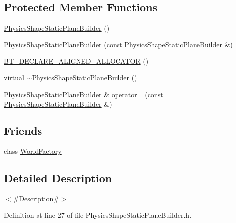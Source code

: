 \subsection*{Protected Member Functions}
\begin{DoxyCompactItemize}
\item 
\mbox{\hyperlink{classnjli_1_1_physics_shape_static_plane_builder_a5a7fa33500a4bbf8273222d57e70e245}{Physics\+Shape\+Static\+Plane\+Builder}} ()
\item 
\mbox{\hyperlink{classnjli_1_1_physics_shape_static_plane_builder_af4b40b5f32bbc64e6e337c76cf2a1c2d}{Physics\+Shape\+Static\+Plane\+Builder}} (const \mbox{\hyperlink{classnjli_1_1_physics_shape_static_plane_builder}{Physics\+Shape\+Static\+Plane\+Builder}} \&)
\item 
\mbox{\hyperlink{classnjli_1_1_physics_shape_static_plane_builder_a84a723711e9c7fc80aae534cb2ccd1ba}{B\+T\+\_\+\+D\+E\+C\+L\+A\+R\+E\+\_\+\+A\+L\+I\+G\+N\+E\+D\+\_\+\+A\+L\+L\+O\+C\+A\+T\+OR}} ()
\item 
virtual \mbox{\hyperlink{classnjli_1_1_physics_shape_static_plane_builder_a843535153945d4982db72379fe9b5812}{$\sim$\+Physics\+Shape\+Static\+Plane\+Builder}} ()
\item 
\mbox{\hyperlink{classnjli_1_1_physics_shape_static_plane_builder}{Physics\+Shape\+Static\+Plane\+Builder}} \& \mbox{\hyperlink{classnjli_1_1_physics_shape_static_plane_builder_a73fe0c31f106a69bd158632454edd637}{operator=}} (const \mbox{\hyperlink{classnjli_1_1_physics_shape_static_plane_builder}{Physics\+Shape\+Static\+Plane\+Builder}} \&)
\end{DoxyCompactItemize}
\subsection*{Friends}
\begin{DoxyCompactItemize}
\item 
class \mbox{\hyperlink{classnjli_1_1_physics_shape_static_plane_builder_acb96ebb09abe8f2a37a915a842babfac}{World\+Factory}}
\end{DoxyCompactItemize}


\subsection{Detailed Description}
$<$\#\+Description\#$>$ 

Definition at line 27 of file Physics\+Shape\+Static\+Plane\+Builder.\+h.



